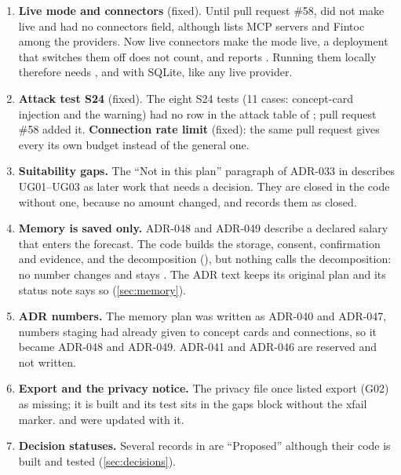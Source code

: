 \begin{enumerate}
    that override, its nginx configuration and its runbook exist only on the unmerged branch
    , so what this document says about the edge (TLS, the tunnel, nginx headers) comes from
    that branch, not from the commit described.
  \item \textbf{Live mode and connectors} (fixed). Until pull request \#58,  did not make
     live and  had no connectors field, although  lists MCP
    servers and Fintoc among the providers. Now live connectors make the mode live, a deployment that switches them off
    does not count, and  reports . Running them locally therefore needs
    , and  with SQLite, like any live provider.
  \item \textbf{Attack test S24} (fixed). The eight S24 tests (11 cases: concept-card injection and the
     warning) had no row in the attack table of ; pull request \#58
    added it. \textbf{Connection rate limit} (fixed): the same pull request gives every  its own
    budget instead of the general one.
  \item \textbf{Suitability gaps.} The ``Not in this plan'' paragraph of ADR-033 in  describes
    UG01--UG03 as later work that needs a  decision. They are closed in the code without one,
    because no amount changed, and  records them as closed.
  \item \textbf{Memory is saved only.} ADR-048 and ADR-049 describe a declared salary that enters the forecast. The
    code builds the storage, consent, confirmation and evidence, and the decomposition (), but
    nothing calls the decomposition: no number changes and  stays . The ADR text keeps its
    original plan and its status note says so (\cref{sec:memory}).
  \item \textbf{ADR numbers.} The memory plan was written as ADR-040 and ADR-047, numbers staging had already given to
    concept cards and connections, so it became ADR-048 and ADR-049. ADR-041 and ADR-046 are reserved and not written.
  \item \textbf{Export and the privacy notice.} The privacy file once listed export (G02) as missing; it is built and
    its test sits in the gaps block without the xfail marker.  and  were
    updated with it.
  \item \textbf{Decision statuses.} Several records in  are ``Proposed'' although their code is
    built and tested (\cref{sec:decisions}).
\end{enumerate}

